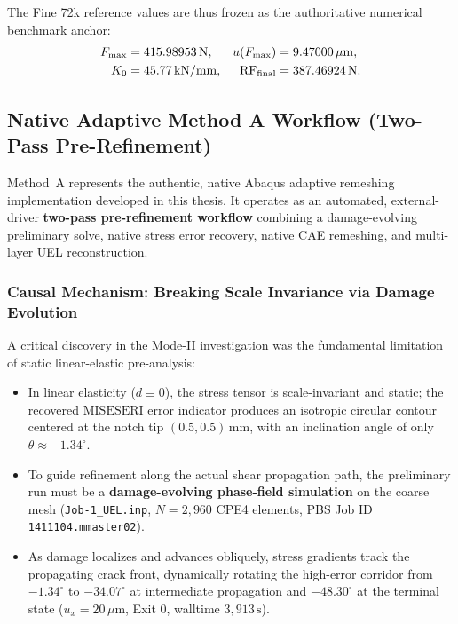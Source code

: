 The Fine 72k reference values are thus frozen as the authoritative numerical benchmark anchor:
\begin{align}
  F_{\max} &= 415.98953\,\mathrm{N}, & u(F_{\max}) &= 9.47000\,\mu\mathrm{m}, \notag \\
  K_0 &= 45.77\,\mathrm{kN/mm}, & \mathrm{RF}_{\mathrm{final}} &= 387.46924\,\mathrm{N}.
  \label{eq:mode2_fine_anchor_values}
\end{align}

\subsection{Native Adaptive Method A Workflow (Two-Pass Pre-Refinement)}
\label{subsec:mode2_method_a_workflow}

Method~A represents the authentic, native Abaqus adaptive remeshing implementation developed in this thesis. It operates as an automated, external-driver \textbf{two-pass pre-refinement workflow} combining a damage-evolving preliminary solve, native stress error recovery, native CAE remeshing, and multi-layer UEL reconstruction.

\subsubsection{Causal Mechanism: Breaking Scale Invariance via Damage Evolution}
A critical discovery in the Mode-II investigation was the fundamental limitation of static linear-elastic pre-analysis:
\begin{itemize}
  \item In linear elasticity ($d \equiv 0$), the stress tensor is scale-invariant and static; the recovered $\mathrm{MISESERI}$ error indicator produces an isotropic circular contour centered at the notch tip $(0.5, 0.5)\,\mathrm{mm}$, with an inclination angle of only $\theta \approx -1.34^\circ$.
  \item To guide refinement along the actual shear propagation path, the preliminary run must be a \textbf{damage-evolving phase-field simulation} on the coarse mesh (\texttt{Job-1\_UEL.inp}, $N = 2{,}960$ CPE4 elements, PBS Job ID \texttt{1411104.mmaster02}).
  \item As damage localizes and advances obliquely, stress gradients track the propagating crack front, dynamically rotating the high-error corridor from $-1.34^\circ$ to $\mathbf{-34.07^\circ}$ at intermediate propagation and $\mathbf{-48.30^\circ}$ at the terminal state ($u_x = 20\,\mu\mathrm{m}$, Exit 0, walltime $3{,}913\,\mathrm{s}$).
\end{itemize}

